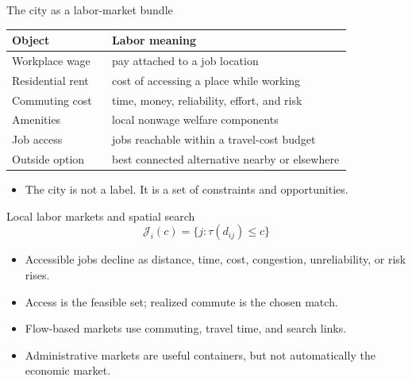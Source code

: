 \documentclass[aspectratio=169,11pt]{beamer}
\begin{document}
\begin{frame}{The city as a labor-market bundle}
\small
\begin{tabular}{p{0.25\linewidth} p{0.60\linewidth}}
\toprule
Object & Labor meaning \\
\midrule
Workplace wage & pay attached to a job location \\
Residential rent & cost of accessing a place while working \\
Commuting cost & time, money, reliability, effort, and risk \\
Amenities & local nonwage welfare components \\
Job access & jobs reachable within a travel-cost budget \\
Outside option & best connected alternative nearby or elsewhere \\
\bottomrule
\end{tabular}
\vspace{0.35cm}
\begin{itemize}
    \item The city is not a label. It is a set of constraints and opportunities.
\end{itemize}
\end{frame}

\begin{frame}{Local labor markets and spatial search}
\[
\mathcal{J}_i(c) = \{j : \tau(d_{ij}) \leq c\}
\]
\begin{itemize}
    \item Accessible jobs decline as distance, time, cost, congestion, unreliability, or risk rises.
    \item Access is the feasible set; realized commute is the chosen match.
    \item Flow-based markets use commuting, travel time, and search links.
    \item Administrative markets are useful containers, but not automatically the economic market.
\end{itemize}
\end{frame}
\end{document}

